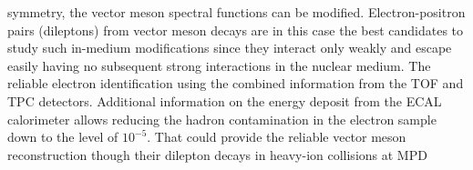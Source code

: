 \documentclass[dvipsnames] {beamer}
\begin{document}
\begin{frame}
{    symmetry, the vector meson spectral functions can be modified. Electron-positron pairs (dileptons) from vector meson decays
    are in this case the best candidates to study such in-medium modifications since they interact only weakly and escape easily
    having no subsequent strong interactions in the nuclear medium.
    The reliable electron identification using the combined information from the TOF and TPC detectors.
    Additional information on the energy deposit from the ECAL calorimeter allows reducing the hadron
    contamination in the electron sample down to the level of $10^{-5}$.
    That could provide the reliable vector meson reconstruction though their dilepton decays in heavy-ion collisions at MPD
  }
\end{frame}

\end{document}
